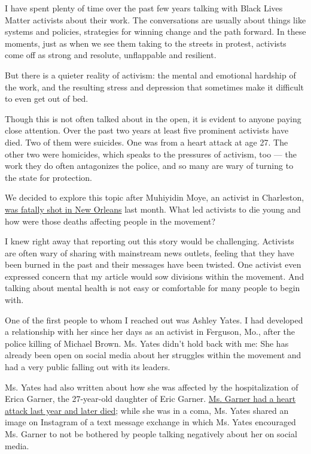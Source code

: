 I have spent plenty of time over the past few years talking with Black
Lives Matter activists about their work. The conversations are usually
about things like systems and policies, strategies for winning change
and the path forward. In these moments, just as when we see them taking
to the streets in protest, activists come off as strong and resolute,
unflappable and resilient.

But there is a quieter reality of activism: the mental and emotional
hardship of the work, and the resulting stress and depression that
sometimes make it difficult to even get out of bed.

Though this is not often talked about in the open, it is evident to
anyone paying close attention. Over the past two years at least five
prominent activists have died. Two of them were suicides. One was from a
heart attack at age 27. The other two were homicides, which speaks to
the pressures of activism, too --- the work they do often antagonizes
the police, and so many are wary of turning to the state for protection.

We decided to explore this topic after Muhiyidin Moye, an activist in
Charleston,
\href{https://www.nytimes.com/2018/02/07/us/muhiyidin-moye-dbaha-dead-black-lives-matter.html}{was
fatally shot in New Orleans} last month. What led activists to die young
and how were those deaths affecting people in the movement?

I knew right away that reporting out this story would be challenging.
Activists are often wary of sharing with mainstream news outlets,
feeling that they have been burned in the past and their messages have
been twisted. One activist even expressed concern that my article would
sow divisions within the movement. And talking about mental health is
not easy or comfortable for many people to begin with.

One of the first people to whom I reached out was Ashley Yates. I had
developed a relationship with her since her days as an activist in
Ferguson, Mo., after the police killing of Michael Brown. Ms. Yates
didn't hold back with me: She has already been open on social media
about her struggles within the movement and had a very public falling
out with its leaders.

Ms. Yates had also written about how she was affected by the
hospitalization of Erica Garner, the 27-year-old daughter of Eric
Garner.
\href{https://www.nytimes.com/2017/12/30/nyregion/erica-garner-dead.html}{Ms.
Garner had a heart attack last year and later died}; while she was in a
coma, Ms. Yates shared an image on Instagram of a text message exchange
in which Ms. Yates encouraged Ms. Garner to not be bothered by people
talking negatively about her on social media.

